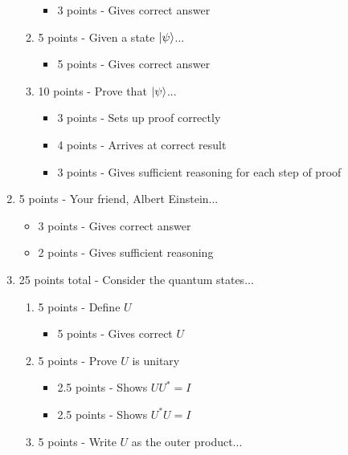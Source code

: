 \documentclass[12pt]{article}
\begin{document}
\begin{enumerate}[font=\bfseries]
\begin{enumerate}
\begin{itemize}
                    \item 3 points - Gives correct answer 
                \end{itemize}
            \item 5 points - Given a state $\ket{\psi}$...
                \begin{itemize}
                    \item 5 points - Gives correct answer 
                \end{itemize}
            \item 10 points - Prove that $\ket{\psi}$...
                \begin{itemize}
                    \item 3 points - Sets up proof correctly
                    \item 4 points - Arrives at correct result
                    \item 3 points - Gives sufficient reasoning for each step of proof
                \end{itemize}
        \end{enumerate}
    \item 5 points - Your friend, Albert Einstein...
        \begin{itemize}
            \item 3 points - Gives correct answer
            \item 2 points - Gives sufficient reasoning
        \end{itemize}
    \item 25 points total - Consider the quantum states...
        \begin{enumerate}
            \item 5 points - Define $U$
                \begin{itemize}
                    \item 5 points - Gives correct $U$
                \end{itemize}
            \item 5 points - Prove $U$ is unitary
                \begin{itemize}
                    \item 2.5 points - Shows $UU^* = I$
                    \item 2.5 points - Shows $U^*U = I$
                \end{itemize}
            \item 5 points - Write $U$ as the outer product...
                \begin{itemize}

\end{itemize}
\end{enumerate}
\end{enumerate}
\end{document}
